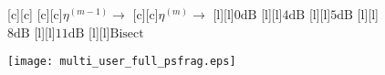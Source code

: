 \documentclass{article}
\begin{document}
\begin{figure}[htb]
  \begin{center}

        [c][c]{}
        [c][c]{$\eta^{(m-1)} \rightarrow$}
        [c][c]{$\eta^{(m)} \rightarrow$}
        [l][l]{$\mathrm{0dB}$}
        [l][l]{$\mathrm{4dB}$}
	[l]{$\mathrm{5dB}$}
	[l]{$\mathrm{8dB}$}
        [l][l]{$\mathrm{11dB}$}       
	[l]{$\mathrm{Bisect}$}

    \texttt{[image: multi\_user\_full\_psfrag.eps]}
    \end{center}
\end{figure}
\end{document}
